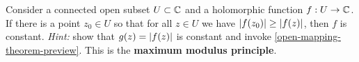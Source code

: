 \documentclass{homework}
\begin{document}
                                                                                                                                                                                                                                                                                                  \begin{problem}\label{maximum-modulus-principle}
                                                                                                                                                                                                                                                                                                  Consider a connected open subset $U \subset \mathbb{C}$ and a holomorphic
                                                                                                                                                                                                                                                                                                    function $f : U \to \mathbb{C}$.  If there is a point $z_0 \in U$ so that
                                                                                                                                                                                                                                                                                                      for all $z \in U$ we have $\left|f(z_0)\right| \geq \left|f(z)\right|$, then $f$
                                                                                                                                                                                                                                                                                                        is constant.  \textit{Hint:} show that $g(z) = \left|f(z)\right|$ is
                                                                                                                                                                                                                                                                                                          constant and invoke \ref{open-mapping-theorem-preview}.  This is the
                                                                                                                                                                                                                                                                                                            \textbf{maximum modulus principle}.
                                                                                                                                                                                                                                                                                                            \end{problem}
\end{document}
